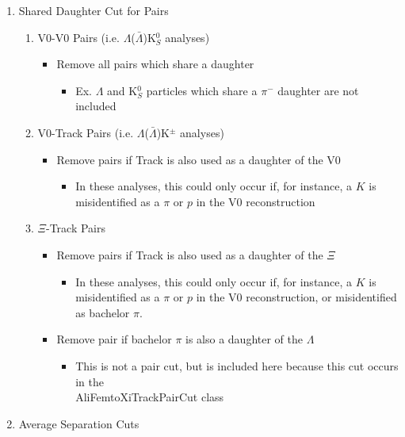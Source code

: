 \documentclass[ALICE,manyauthors]{cernphprep}
\begin{document}
\begin{enumerate}
 \item Shared Daughter Cut for Pairs
 \begin{enumerate}
  \item V0-V0 Pairs (i.e. $\Lambda$($\bar{\Lambda}$)K$^{0}_{S}$ analyses)
  \begin{itemize}
   \item Remove all pairs which share a daughter 
   \begin{itemize}
    \item Ex. $\Lambda$ and K$^{0}_{S}$ particles which share a $\pi^{-}$ daughter are not included
   \end{itemize} 
  \end{itemize}
  \item V0-Track Pairs (i.e. $\Lambda$($\bar{\Lambda}$)K$^{\pm}$ analyses)
  \begin{itemize}
   \item Remove pairs if Track is also used as a daughter of the V0
   \begin{itemize}
    \item In these analyses, this could only occur if, for instance, a $K$ is misidentified as a $\pi$ or $p$ in the V0 reconstruction
   \end{itemize}
  \end{itemize}
  \item $\Xi$-Track Pairs
  \begin{itemize}
   \item Remove pairs if Track is also used as a daughter of the $\Xi$
   \begin{itemize}
    \item In these analyses, this could only occur if, for instance, a $K$ is misidentified as a $\pi$ or $p$ in the V0 reconstruction, or misidentified as bachelor $\pi$.
   \end{itemize}
   \item Remove pair if bachelor $\pi$ is also a daughter of the $\Lambda$
   \begin{itemize}
    \item This is not a pair cut, but is included here because this cut occurs in the \\AliFemtoXiTrackPairCut class
   \end{itemize}
  \end{itemize}  
 \end{enumerate}
 \item Average Separation Cuts
 \begin{itemize}

\end{itemize}
\end{enumerate}
\end{document}
